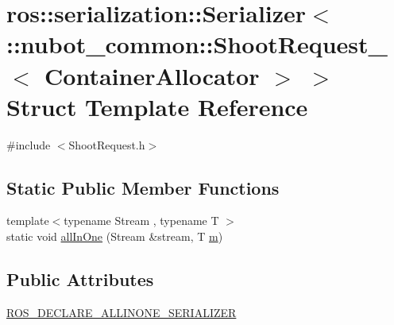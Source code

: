 \hypertarget{structros_1_1serialization_1_1Serializer_3_01_1_1nubot__common_1_1ShootRequest___3_01ContainerAllocator_01_4_01_4}{\section{ros\-:\-:serialization\-:\-:Serializer$<$ \-:\-:nubot\-\_\-common\-:\-:Shoot\-Request\-\_\-$<$ Container\-Allocator $>$ $>$ Struct Template Reference}
\label{structros_1_1serialization_1_1Serializer_3_01_1_1nubot__common_1_1ShootRequest___3_01ContainerAllocator_01_4_01_4}
}


{\ttfamily \#include $<$Shoot\-Request.\-h$>$}

\subsection*{Static Public Member Functions}
\begin{DoxyCompactItemize}
\item 
{\footnotesize template$<$typename Stream , typename T $>$ }\\static void \hyperlink{structros_1_1serialization_1_1Serializer_3_01_1_1nubot__common_1_1ShootRequest___3_01ContainerAllocator_01_4_01_4_af461695d4b8ada4f61bb8a8ad409be93}{all\-In\-One} (Stream \&stream, T \hyperlink{nubot__gazebo_8cc_a9990e99e87d163c58817550b21d35a83}{m})
\end{DoxyCompactItemize}
\subsection*{Public Attributes}
\begin{DoxyCompactItemize}
\item 
\hyperlink{structros_1_1serialization_1_1Serializer_3_01_1_1nubot__common_1_1ShootRequest___3_01ContainerAllocator_01_4_01_4_a16f0bcbedcf97bb3dc960e2f96fa472d}{R\-O\-S\-\_\-\-D\-E\-C\-L\-A\-R\-E\-\_\-\-A\-L\-L\-I\-N\-O\-N\-E\-\_\-\-S\-E\-R\-I\-A\-L\-I\-Z\-E\-R}
\end{DoxyCompactItemize}


